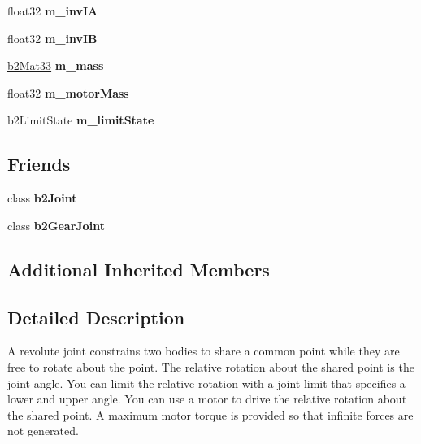 \begin{DoxyCompactItemize}
\item 
float32 {\bfseries m\+\_\+inv\+IA}\hypertarget{classb2_revolute_joint_a948a49144e282f7db22b1f20379c6099}{}\label{classb2_revolute_joint_a948a49144e282f7db22b1f20379c6099}

\item 
float32 {\bfseries m\+\_\+inv\+IB}\hypertarget{classb2_revolute_joint_a7c224fc59adebaa00590217ab8a2c685}{}\label{classb2_revolute_joint_a7c224fc59adebaa00590217ab8a2c685}

\item 
\hyperlink{structb2_mat33}{b2\+Mat33} {\bfseries m\+\_\+mass}\hypertarget{classb2_revolute_joint_a284ae761074305d5032a2b666efb0650}{}\label{classb2_revolute_joint_a284ae761074305d5032a2b666efb0650}

\item 
float32 {\bfseries m\+\_\+motor\+Mass}\hypertarget{classb2_revolute_joint_aced7e455dd33ccb17a1d4ff9bb80c442}{}\label{classb2_revolute_joint_aced7e455dd33ccb17a1d4ff9bb80c442}

\item 
b2\+Limit\+State {\bfseries m\+\_\+limit\+State}\hypertarget{classb2_revolute_joint_abe77594f4773d21dabd8912d6630dc6a}{}\label{classb2_revolute_joint_abe77594f4773d21dabd8912d6630dc6a}

\end{DoxyCompactItemize}
\subsection*{Friends}
\begin{DoxyCompactItemize}
\item 
class {\bfseries b2\+Joint}\hypertarget{classb2_revolute_joint_a54ade8ed3d794298108d7f4c4e4793fa}{}\label{classb2_revolute_joint_a54ade8ed3d794298108d7f4c4e4793fa}

\item 
class {\bfseries b2\+Gear\+Joint}\hypertarget{classb2_revolute_joint_a13c275221e30bb485e17e4e04553cb71}{}\label{classb2_revolute_joint_a13c275221e30bb485e17e4e04553cb71}

\end{DoxyCompactItemize}
\subsection*{Additional Inherited Members}


\subsection{Detailed Description}
A revolute joint constrains two bodies to share a common point while they are free to rotate about the point. The relative rotation about the shared point is the joint angle. You can limit the relative rotation with a joint limit that specifies a lower and upper angle. You can use a motor to drive the relative rotation about the shared point. A maximum motor torque is provided so that infinite forces are not generated. 

